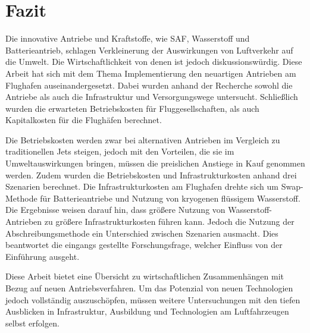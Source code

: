 \chapter{Fazit}
\label{ch:Fazit}
Die innovative Antriebe und Kraftstoffe, wie SAF, Wasserstoff und Batterieantrieb, schlagen Verkleinerung der Auswirkungen von Luftverkehr auf die Umwelt. 
Die Wirtschaftlichkeit von denen ist jedoch diskussionswürdig.
Diese Arbeit hat sich mit dem Thema Implementierung den neuartigen Antrieben am Flughafen auseinandergesetzt. 
Dabei wurden anhand der Recherche sowohl die Antriebe als auch die Infrastruktur und Versorgungswege untersucht.
Schließlich wurden die erwarteten Betriebskosten für Fluggesellschaften, als auch Kapitalkosten für die Flughäfen berechnet.

Die Betriebskosten werden zwar bei alternativen Antrieben im Vergleich zu traditionellen Jets steigen, 
jedoch mit den Vorteilen, die sie im Umweltauswirkungen bringen, 
müssen die preislichen Anstiege in Kauf genommen werden. Zudem wurden die Betriebskosten und Infrastrukturkosten anhand drei Szenarien
berechnet. Die Infrastrukturkosten am Flughafen drehte sich um Swap-Methode für Batterieantriebe und Nutzung von kryogenen flüssigem Wasserstoff.
Die Ergebnisse weisen darauf hin, dass größere Nutzung von Wasserstoff-Antrieben zu größere Infrastrukturkosten führen kann.
Jedoch die Nutzung der Abschreibungsmethode ein Unterschied zwischen Szenarien ausmacht. Dies beantwortet die 
eingangs gestellte Forschungsfrage, welcher Einfluss von der Einführung ausgeht.

Diese Arbeit bietet eine Übersicht zu wirtschaftlichen Zusammenhängen mit Bezug auf neuen Antriebsverfahren.
Um das Potenzial von neuen Technologien jedoch vollständig auszuschöpfen, müssen weitere Untersuchungen mit den tiefen Ausblicken
in Infrastruktur, Ausbildung und Technologien am Luftfahrzeugen selbst erfolgen.
